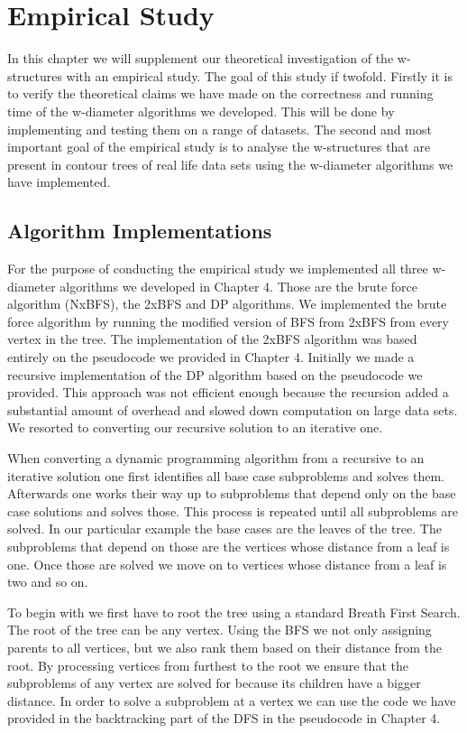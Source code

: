 \chapter{Empirical Study}
\label{chapter7}

In this chapter we will supplement our theoretical investigation of the w-structures with an empirical study. The goal of this study if twofold. Firstly it is to verify the theoretical claims we have made on the correctness and running time of the w-diameter algorithms we developed. This will be done by implementing and testing them on a range of datasets. The second and most important goal of the empirical study is to analyse the w-structures that are present in contour trees of real life data sets using the w-diameter algorithms we have implemented.

\section{Algorithm Implementations}

For the purpose of conducting the empirical study we implemented all three w-diameter algorithms we developed in Chapter 4. Those are the brute force algorithm (NxBFS), the 2xBFS and DP algorithms.  We implemented the brute force algorithm by running the modified version of BFS from 2xBFS from every vertex in the tree. The implementation of the 2xBFS algorithm was based entirely on the pseudocode we provided in Chapter 4. Initially we made a recursive implementation of the DP algorithm based on the pseudocode we provided. This approach was not efficient enough because the recursion added a substantial amount of overhead and slowed down computation on large data sets. We resorted to converting our recursive solution to an iterative one.

When converting a dynamic programming algorithm from a recursive to an iterative solution one first identifies all base case subproblems and solves them. Afterwards one works their way up to subproblems that depend only on the base case solutions and solves those. This process is repeated until all subproblems are solved. In our particular example the base cases are the leaves of the tree. The subproblems that depend on those are the vertices whose distance from a leaf is one. Once those are solved we move on to vertices whose distance from a leaf is two and so on.

To begin with we first have to root the tree using a standard Breath First Search. The root of the tree can be any vertex. Using the BFS we not only assigning parents to all vertices, but we also rank them based on their distance from the root. By processing vertices from furthest to the root we ensure that the subproblems of any vertex are solved for because its children have a bigger distance. In order to solve a subproblem at a vertex we can use the code we have provided in the backtracking part of the DFS in the pseudocode in Chapter 4.


